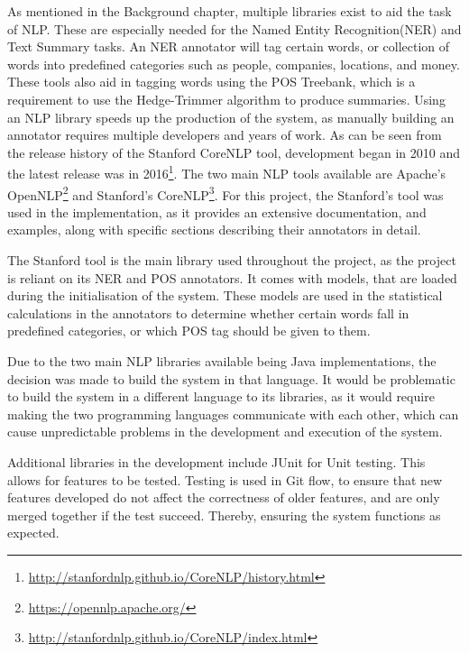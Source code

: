 \par As mentioned in the Background chapter, multiple libraries exist to aid the task of NLP. These are especially needed for the Named Entity Recognition(NER) and Text Summary tasks. An NER annotator will tag certain words, or collection of words into predefined categories such as people, companies, locations, and money. These tools also aid in tagging words using the POS Treebank, which is a requirement to use the Hedge-Trimmer algorithm \cite{dorrzajicschwartz2003} to produce summaries. Using an NLP library speeds up the production of the system, as manually building an annotator requires multiple developers and years of work. As can be seen from the release history of the Stanford CoreNLP tool, development began in 2010 and the latest release was in 2016\footnote{\url{http://stanfordnlp.github.io/CoreNLP/history.html}}. The two main NLP tools available are Apache's OpenNLP\footnote{\url{https://opennlp.apache.org/}} and Stanford's CoreNLP\footnote{\url{http://stanfordnlp.github.io/CoreNLP/index.html}}. For this project, the Stanford's tool was used in the implementation, as it provides an extensive documentation, and examples, along with specific sections describing their annotators in detail.

\par The Stanford tool is the main library used throughout the project, as the project is reliant on its NER \cite{finkelgrenagermanning2005} and POS \cite{toutanovakleinmanningsinger2003} annotators. It comes with models, that are loaded during the initialisation of the system. These models are used in the statistical calculations in the annotators to determine whether certain words fall in predefined categories, or which POS tag should be given to them.

\par Due to the two main NLP libraries available being Java implementations, the decision was made to build the system in that language. It would be problematic to build the system in a different language to its libraries, as it would require making the two programming languages communicate with each other, which can cause unpredictable problems in the development and execution of the system.

\par Additional libraries in the development include JUnit for Unit testing. This allows for features to be tested. Testing is used in Git flow, to ensure that new features developed do not affect the correctness of older features, and are only merged together if the test succeed. Thereby, ensuring the system functions as expected.


